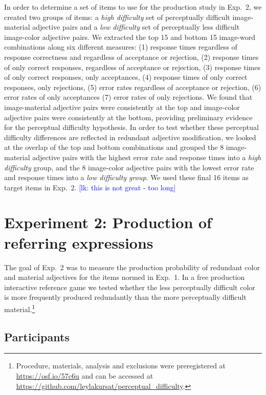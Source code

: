 \documentclass[12pt,letterpaper]{article}
\newcommand{\lk}[1]{\textcolor{Blue}{[lk: #1]}}
\begin{document}
In order to determine a set of items to use for the production study in Exp.~2, we created two groups of items: a \textit{high difficulty} set of perceptually difficult image-material adjective pairs and a  \textit{low difficulty} set of perceptually less difficult image-color adjective pairs. We extracted the top 15 and bottom 15 image-word combinations along six different measures: (1) response times regardless of response correctness and regardless of acceptance or rejection, (2) response times of only correct responses, regardless of acceptance or rejection, (3) response times of only correct responses, only acceptances, (4) response times of only correct responses, only rejections, (5) error rates regardless of acceptance or rejection, (6) error rates of only acceptances (7) error rates of only rejections. We found that image-material adjective pairs were consistently at the top and image-color adjective pairs were consistently at the bottom, providing preliminary evidence for the perceptual difficulty hypothesis. In order to test whether these perceptual difficulty differences are reflected in redundant adjective modification, we looked at the overlap of the top and bottom combinations and grouped the 8 image-material adjective pairs with the highest error rate and response times into a \textit{high difficulty} group, and the 8 image-color adjective pairs with the lowest error rate and response times into a \textit{low difficulty group}. We used these final 16 items as target items in Exp.~2. \lk{this is not great - too long}

\section{Experiment 2: Production of referring expressions} 

The goal of Exp.~2 was to measure the production probability of redundant color and material adjectives for the items normed in Exp.~1. In a free production interactive reference game we tested whether the less perceptually difficult color is more frequently produced redundantly than the more perceptually difficult material.\footnote{Procedure, materials, analysis and exclusions were preregistered at \href{https://osf.io/57c6u}{https://osf.io/57c6u} and can be accessed at \href{https://github.com/leylakursat/perceptual_difficulty}{https://github.com/leylakursat/perceptual\_difficulty}.}

\subsection{Participants} 
\end{document}
